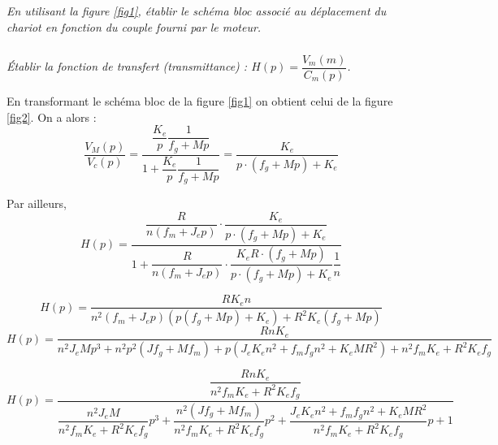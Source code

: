 \documentclass[10pt,fleqn]{article} %
\begin{document}
\begin{multicols}{2}
\begin{corrige}
\begin{center}
\end{center}
\end{corrige}
\else
\fi
\subparagraph{} \textit{En utilisant la figure \ref{fig1}, établir le schéma bloc associé au déplacement du chariot en fonction du couple fourni par le moteur.}


\subparagraph{} \textit{Établir la fonction de transfert (transmittance) : $H(p) = \dfrac{V_m(m)}{C_m(p)}$.}
\ifprof
\begin{corrige}
En transformant le schéma bloc de la figure \ref{fig1} on obtient celui de la figure \ref{fig2}. On a alors :
$$\dfrac{V_M(p)}{V_c(p)} = \dfrac{\dfrac{K_e}{p} \dfrac{1}{f_g+Mp}}{1+ \dfrac{K_e}{p} \dfrac{1}{f_g+Mp}} 
= \dfrac{K_e}{p \cdot \left(f_g+Mp \right)+ K_e} 
$$

Par ailleurs, 
$$
H(p)= \dfrac{\dfrac{R}{n\left(f_m + J_e p \right)} \cdot \dfrac{K_e}{p \cdot \left(f_g+Mp \right)+ K_e} }{1+\dfrac{R}{n\left(f_m + J_e p \right)} \cdot \dfrac{K_e R\cdot \left(f_g+Mp \right)}{p \cdot \left(f_g+Mp \right)+ K_e} \dfrac{1}{n}}
$$

$$
H(p)= \dfrac{R K_en}{n^2\left(f_m + J_e p \right)\left(p  \left(f_g+Mp \right)+ K_e\right)+R^2K_e  \left(f_g+Mp \right)}
$$
$$
H(p)= \dfrac{R n K_e}{
n^2J_e M p^3
+ n^2 p^2 \left(Jf_g + M f_m \right)
+ p \left( J_e K_e n^2 + f_m f_g n^2 + K_e M R^2 \right)
+n^2 f_m K_e + R^2 K_e f_g }
$$

$$
H(p)= \dfrac{\dfrac{R n K_e}{n^2 f_m K_e + R^2 K_e f_g}}{
\dfrac{n^2J_e M}{n^2 f_m K_e + R^2 K_e f_g}  p^3
+ \dfrac{n^2\left(Jf_g + M f_m \right)}{n^2 f_m K_e + R^2 K_e f_g}  p^2 
+ \dfrac{ J_e K_e n^2 + f_m f_g n^2 + K_e M R^2 }{n^2 f_m K_e + R^2 K_e f_g} p 
+1 }
$$


\end{corrige}
\end{multicols}
\end{document}
